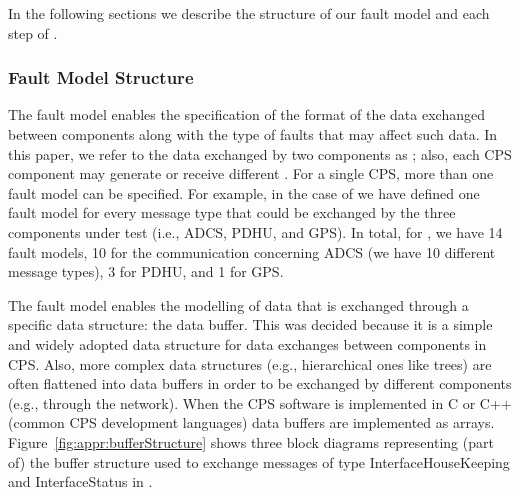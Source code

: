 
In the following sections we describe the structure of our fault model and each step of \APPR.



\subsubsection{Fault Model Structure}
\label{sec:faultModelStructure}





The \APPR fault model enables the specification of the format of the data exchanged between components along with the type of faults that may affect such data.
In this paper, we refer to the data exchanged by two components as ; also, each CPS component may generate or receive different .
For a single CPS, more than one fault model can be specified. For example, in the case of \ESAIL{} we have defined one fault model for every message type that could be exchanged by the three components under test (i.e., ADCS, PDHU, and GPS). In total, for \ESAIL, we have 14 fault models, 10 for the communication concerning ADCS (we have 10 different message types), 3 for PDHU, and 1 for GPS.

The \APPR fault model enables the modelling of data that is exchanged through a specific data structure: the data buffer. This was decided because it is a simple and widely adopted data structure for data exchanges between components in CPS. Also, more complex data structures (e.g., hierarchical ones like trees) are often flattened into data buffers in order to be exchanged by different components (e.g., through the network). When the CPS software is implemented in C or C++ (common CPS development languages) data buffers are implemented as arrays. Figure~\ref{fig:appr:bufferStructure} shows three block diagrams representing (part of) the buffer structure used to exchange messages of type InterfaceHouseKeeping and InterfaceStatus in \ESAIL.

